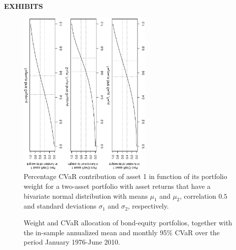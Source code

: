 \documentclass[11pt]{article}
\begin{document}
{\bf  \large \noindent EXHIBITS}

\setcounter{page}{19}


\bigskip


\begin{figure}[h]
\caption{Percentage CVaR contribution of asset 1 in function of its portfolio weight for a two-asset portfolio with asset returns that have a bivariate normal distribution with means $\mu_1$ and $\mu_2$, correlation $0.5$ and standard deviations $\sigma_1$ and $\sigma_2$, respectively.   }
\includegraphics[width=6.5cm,angle=270]{sensitivity_rho50.eps}
\end{figure}


\begin{figure}[h]
\caption{Weight and CVaR allocation of bond-equity portfolios, together with the in-sample annualized mean and monthly 95\% CVaR over
the period January 1976-June 2010.     }
\vspace{1cm}
\end{figure}
\end{document}
